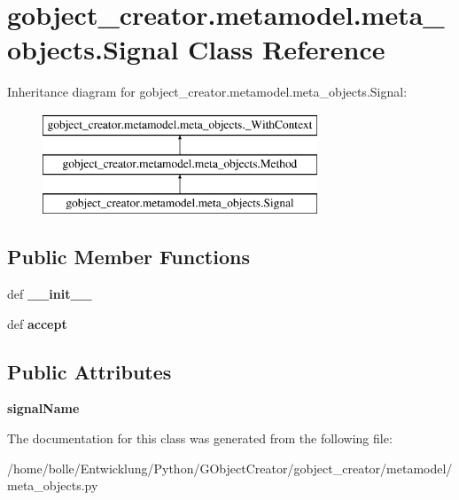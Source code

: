 \hypertarget{classgobject__creator_1_1metamodel_1_1meta__objects_1_1Signal}{
\section{gobject\_\-creator.metamodel.meta\_\-objects.Signal Class Reference}
\label{classgobject__creator_1_1metamodel_1_1meta__objects_1_1Signal}
}
Inheritance diagram for gobject\_\-creator.metamodel.meta\_\-objects.Signal:\begin{figure}[H]
\begin{center}
\leavevmode
\includegraphics[height=3cm]{classgobject__creator_1_1metamodel_1_1meta__objects_1_1Signal}
\end{center}
\end{figure}
\subsection*{Public Member Functions}
\begin{DoxyCompactItemize}
\item 
\hypertarget{classgobject__creator_1_1metamodel_1_1meta__objects_1_1Signal_af0c36404a478de8b15d1a1d925895de1}{
def {\bfseries \_\-\_\-init\_\-\_\-}}
\label{classgobject__creator_1_1metamodel_1_1meta__objects_1_1Signal_af0c36404a478de8b15d1a1d925895de1}

\item 
\hypertarget{classgobject__creator_1_1metamodel_1_1meta__objects_1_1Signal_aa2548b61beda81d0f8384ac46144dfe1}{
def {\bfseries accept}}
\label{classgobject__creator_1_1metamodel_1_1meta__objects_1_1Signal_aa2548b61beda81d0f8384ac46144dfe1}

\end{DoxyCompactItemize}
\subsection*{Public Attributes}
\begin{DoxyCompactItemize}
\item 
\hypertarget{classgobject__creator_1_1metamodel_1_1meta__objects_1_1Signal_ac94e07a05dbc2a9f5937849408031b14}{
{\bfseries signalName}}
\label{classgobject__creator_1_1metamodel_1_1meta__objects_1_1Signal_ac94e07a05dbc2a9f5937849408031b14}

\end{DoxyCompactItemize}


The documentation for this class was generated from the following file:\begin{DoxyCompactItemize}
\item 
/home/bolle/Entwicklung/Python/GObjectCreator/gobject\_\-creator/metamodel/meta\_\-objects.py\end{DoxyCompactItemize}

